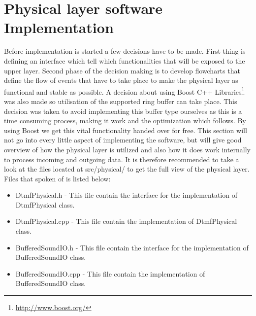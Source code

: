 \section{Physical layer software Implementation}
Before implementation is started a few decisions have to be made. First thing is defining an interface which tell which functionalities
that will be exposed to the upper layer. Second phase of the decision making is to develop flowcharts that define the flow of events 
that have to take place to make the physical layer as functional and stable as possible. A decision about using Boost C++ Libraries\footnote{\url{http://www.boost.org/}} was also made so utilisation of the supported ring buffer can take place. This decision was taken to avoid
implementing this buffer type ourselves as this is a time consuming process, making it work and the optimization which follows.
By using Boost we get this vital functionality handed over for free. This section will not go into every little aspect of implementing
the software, but will give good overview of how the physical layer is utilized and also how it does work internally to process incoming 
and outgoing data. It is therefore recommended to take a look at the files located at src/physical/ to get the full view of the physical layer.
Files that spoken of is listed below:

\begin {itemize}
\item DtmfPhysical.h - This file contain the interface for the implementation of DtmfPhysical class.
\item DtmfPhysical.cpp - This file contain the implementation of DtmfPhysical class.
\item BufferedSoundIO.h - This file contain the interface for the implementation of BufferedSoundIO class.
\item BufferedSoundIO.cpp - This file contain the implementation of BufferedSoundIO class.
\end{itemize}

